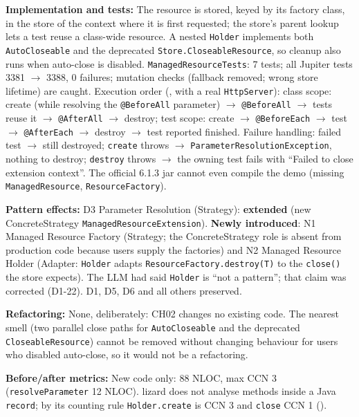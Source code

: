 \documentclass[11pt,a4paper]{article}
\newcommand{\entry}[1]{\textbf{#1:} }
\begin{document}
\entry{Implementation and tests}The resource is stored, keyed by its factory class, in the store of the context where it is first requested; the store's parent lookup lets a test reuse a class-wide resource. A nested \texttt{Holder} implements both \texttt{AutoCloseable} and the deprecated \texttt{Store.CloseableResource}, so cleanup also runs when auto-close is disabled. \texttt{ManagedResourceTests}: 7 tests; all Jupiter tests 3381 $\rightarrow$ 3388, 0 failures; mutation checks (fallback removed; wrong store lifetime) are caught. Execution order (, with a real \texttt{HttpServer}): class scope: create (while resolving the \texttt{@BeforeAll} parameter) $\rightarrow$ \texttt{@BeforeAll} $\rightarrow$ tests reuse it $\rightarrow$ \texttt{@AfterAll} $\rightarrow$ destroy; test scope: create $\rightarrow$ \texttt{@BeforeEach} $\rightarrow$ test $\rightarrow$ \texttt{@AfterEach} $\rightarrow$ destroy $\rightarrow$ test reported finished. Failure handling: failed test $\rightarrow$ still destroyed; \texttt{create} throws $\rightarrow$ \texttt{ParameterResolutionException}, nothing to destroy; \texttt{destroy} throws $\rightarrow$ the owning test fails with ``Failed to close extension context''. The official 6.1.3 jar cannot even compile the demo (missing \texttt{ManagedResource}, \texttt{ResourceFactory}).

\entry{Pattern effects}D3 Parameter Resolution (Strategy): \textbf{extended} (new ConcreteStrategy \texttt{ManagedResourceExtension}). \textbf{Newly introduced}: N1 Managed Resource Factory (Strategy; the ConcreteStrategy role is absent from production code because users supply the factories) and N2 Managed Resource Holder (Adapter: \texttt{Holder} adapts \texttt{ResourceFactory.destroy(T)} to the \texttt{close()} the store expects). The LLM had said \texttt{Holder} is ``not a pattern''; that claim was corrected (D1-22). D1, D5, D6 and all others preserved.

\entry{Refactoring}None, deliberately: CH02 changes no existing code. The nearest smell (two parallel close paths for \texttt{AutoCloseable} and the deprecated \texttt{CloseableResource}) cannot be removed without changing behaviour for users who disabled auto-close, so it would not be a refactoring.

\entry{Before/after metrics}New code only: 88 NLOC, max CCN 3 (\texttt{resolveParameter} 12 NLOC). lizard does not analyse methods inside a Java \texttt{record}; by its counting rule \texttt{Holder.create} is CCN 3 and \texttt{close} CCN 1 ().
\end{document}
